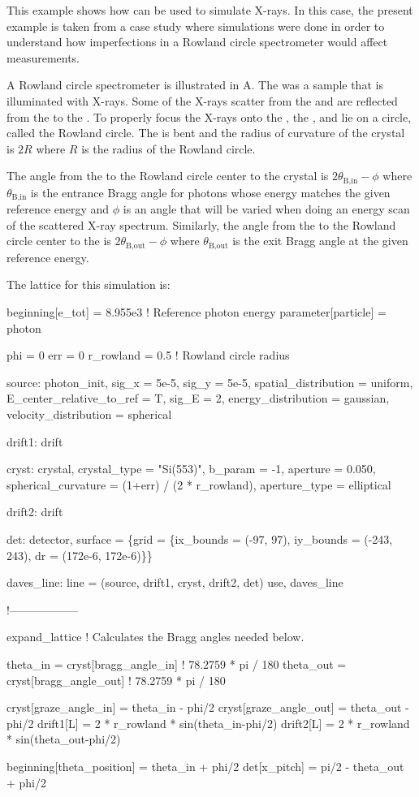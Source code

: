 This example shows how \bmad can be used to simulate X-rays. In this case, the present example is
taken from a case study where simulations were done in order to understand how imperfections in a Rowland
circle spectrometer would affect measurements.

A Rowland circle spectrometer is illustrated in A. The  was
a sample that is illuminated with X-rays. Some of the X-rays scatter from the  and are
reflected from the  to the . To properly focus the X-rays onto the
, the ,  and  lie on a circle, called the Rowland
circle. The  is bent and the radius of curvature of the crystal is
$2R$ where $R$ is the radius of the Rowland circle.

The angle from the  to the Rowland circle center to the crystal is
$2\theta_\text{B,in}-\phi$ where $\theta_\text{B,in}$ is the entrance Bragg angle for photons whose
energy matches the given reference energy and $\phi$ is an angle that will be varied when doing an energy
scan of the scattered X-ray spectrum. Similarly, the angle from the  to the Rowland
circle center to the  is $2\theta_\text{B,out}-\phi$ where $\theta_\text{B,out}$ is the
exit Bragg angle at the given reference energy.

The lattice for this simulation is:
\begin{example}
  beginning[e_tot] = 8.955e3    ! Reference photon energy
  parameter[particle] = photon

  phi = 0
  err = 0
  r_rowland = 0.5               ! Rowland circle radius

  source: photon_init, sig_x = 5e-5, sig_y = 5e-5, spatial_distribution = uniform,
          E_center_relative_to_ref = T, sig_E = 2, energy_distribution = gaussian,
          velocity_distribution = spherical

  drift1: drift

  cryst: crystal, crystal_type = "Si(553)", b_param = -1, aperture = 0.050,
  	spherical_curvature = (1+err) / (2 * r_rowland), aperture_type = elliptical

  drift2: drift

  det: detector, surface = \{grid = \{ix_bounds = (-97, 97), 
                                    iy_bounds = (-243, 243), dr = (172e-6, 172e-6)\}\}

  daves_line: line = (source, drift1, cryst, drift2, det)
  use, daves_line

  !------------------

  expand_lattice ! Calculates the Bragg angles needed below.

  theta_in  = cryst[bragg_angle_in]  ! 78.2759 * pi / 180
  theta_out = cryst[bragg_angle_out] ! 78.2759 * pi / 180

  cryst[graze_angle_in]  = theta_in - phi/2 
  cryst[graze_angle_out] = theta_out - phi/2
  drift1[L] = 2 * r_rowland * sin(theta_in-phi/2)
  drift2[L] = 2 * r_rowland * sin(theta_out-phi/2)

  beginning[theta_position] = theta_in + phi/2
  det[x_pitch] = pi/2 - theta_out + phi/2
\end{example}

